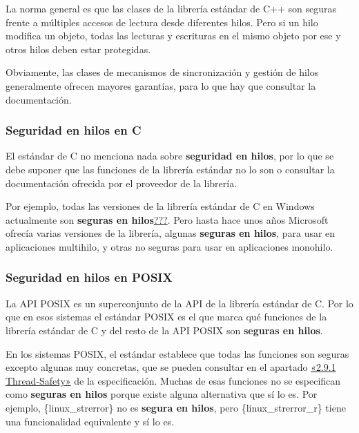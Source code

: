 La norma general es que las clases de la librería estándar de C++ son
seguras frente a múltiples accesos de lectura desde diferentes hilos.
Pero si un hilo modifica un objeto, todas las lecturas y escrituras en
el mismo objeto por ese y otros hilos deben estar protegidas.

Obviamente, las clases de mecanismos de sincronización y gestión de
hilos generalmente ofrecen mayores garantías, para lo que hay que
consultar la documentación.

\subsubsection{Seguridad en hilos en
C}\label{_seguridad_en_hilos_en_c_2}

El estándar de C no menciona nada sobre \textbf{seguridad en hilos}, por
lo que se debe suponer que las funciones de la librería estándar no lo
son o consultar la documentación ofrecida por el proveedor de la
librería.

Por ejemplo, todas las versiones de la librería estándar de C en Windows
actualmente son \textbf{seguras en
hilos}\hyperref[Microsoft-MultithreadingWithC]{???}. Pero hasta hace
unos años Microsoft ofrecía varias versiones de la librería, algunas
\textbf{seguras en hilos}, para usar en aplicaciones multihilo, y otras
no seguras para usar en aplicaciones monohilo.

\subsubsection{Seguridad en hilos en
POSIX}\label{_seguridad_en_hilos_en_posix}

La API POSIX es un superconjunto de la API de la librería estándar de C.
Por lo que en esos sistemas el estándar POSIX es el que marca qué
funciones de la librería estándar de C y del resto de la API POSIX son
\textbf{seguras en hilos}.

En los sistemas POSIX, el estándar establece que todas las funciones son
seguras excepto algunas muy concretas, que se pueden consultar en el
apartado
\href{https://pubs.opengroup.org/onlinepubs/9699919799/functions/V2_chap02.html\#tag_15_09_01}{«2.9.1
Thread-Safety»} de la especificación. Muchas de esas funciones no se
especifican como \textbf{seguras en hilos} porque existe alguna
alternativa que sí lo es. Por ejemplo, \{linux\_strerror\} no es
\textbf{segura en hilos}, pero \{linux\_strerror\_r\} tiene una
funcionalidad equivalente y sí lo es.
